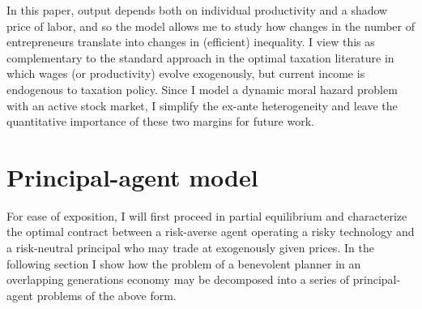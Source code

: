 \documentclass[11pt]{article}
\theoremstyle{plain}
\begin{document}

In this paper, output depends both on individual productivity and a shadow price of labor, and so the model allows me to study how changes in the number of entrepreneurs translate into changes in (efficient) inequality. I view this as complementary to the standard approach in the optimal taxation literature in which wages (or productivity) evolve exogenously, but current income is endogenous to taxation policy. Since I model a dynamic moral hazard problem with an active stock market, I simplify the ex-ante heterogeneity and leave the quantitative importance of these two margins for future work. 


\section{Principal-agent model} \label{PriAg}

For ease of exposition, I will first proceed in partial equilibrium and characterize the optimal contract between a risk-averse agent operating a risky technology and a risk-neutral principal who may trade at exogenously given prices. In the following section I show how the problem of a benevolent planner in an overlapping generations economy may be decomposed into a series of principal-agent problems of the above form.

\end{document}
